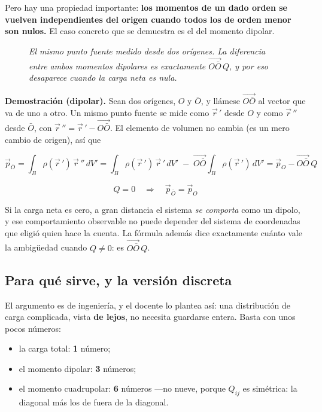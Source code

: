 \documentclass[12pt,a4paper]{article}
\begin{document}
Pero hay una propiedad importante: \textbf{los momentos de un dado orden se
vuelven independientes del origen cuando todos los de orden menor son nulos.} El
caso concreto que se demuestra es el del momento dipolar.

\begin{figure}[H]
  \centering
  
  \caption*{\small\itshape El mismo punto fuente medido desde dos orígenes. La
  diferencia entre ambos momentos dipolares es exactamente $\vec{O\bar O}\,Q$, y
  por eso desaparece cuando la carga neta es nula.}
\end{figure}

\textbf{Demostración (dipolar).} Sean dos orígenes, $O$ y $\bar O$, y llámese
$\vec{O\bar O}$ al vector que va de uno a otro. Un mismo punto fuente se mide como
$\vec r\,'$ desde $O$ y como $\vec r\,''$ desde $\bar O$, con
$\vec r\,'' = \vec r\,' - \vec{O\bar O}$. El elemento de volumen no cambia (es un
mero cambio de origen), así que

\[
\vec p_{\bar O} = \int_B \rho(\vec r\,')\,\vec r\,''\,dV'
= \int_B \rho(\vec r\,')\,\vec r\,'\,dV' \;-\; \vec{O\bar O}\int_B \rho(\vec r\,')\,dV'
= \vec p_{O} - \vec{O\bar O}\,Q
\]

\[
\boxed{\;Q = 0 \quad\Longrightarrow\quad \vec p_{\bar O} = \vec p_{O}\;}
\]

\begin{notebox}
Si la carga neta es cero, a gran distancia el sistema \emph{se comporta} como un
dipolo, y ese comportamiento observable no puede depender del sistema de
coordenadas que eligió quien hace la cuenta. La fórmula además dice exactamente
cuánto vale la ambigüedad cuando $Q\neq0$: es $\vec{O\bar O}\,Q$.
\end{notebox}

\subsection{Para qué sirve, y la versión discreta}

El argumento es de ingeniería, y el docente lo plantea así: una distribución de
carga complicada, vista \textbf{de lejos}, no necesita guardarse entera. Basta
con unos pocos números:

\begin{itemize}[nosep]
  \item la carga total: \textbf{1} número;
  \item el momento dipolar: \textbf{3} números;
  \item el momento cuadrupolar: \textbf{6} números ---no nueve, porque $Q_{ij}$
        es simétrica: la diagonal más los de fuera de la diagonal.
\end{itemize}
\end{document}
